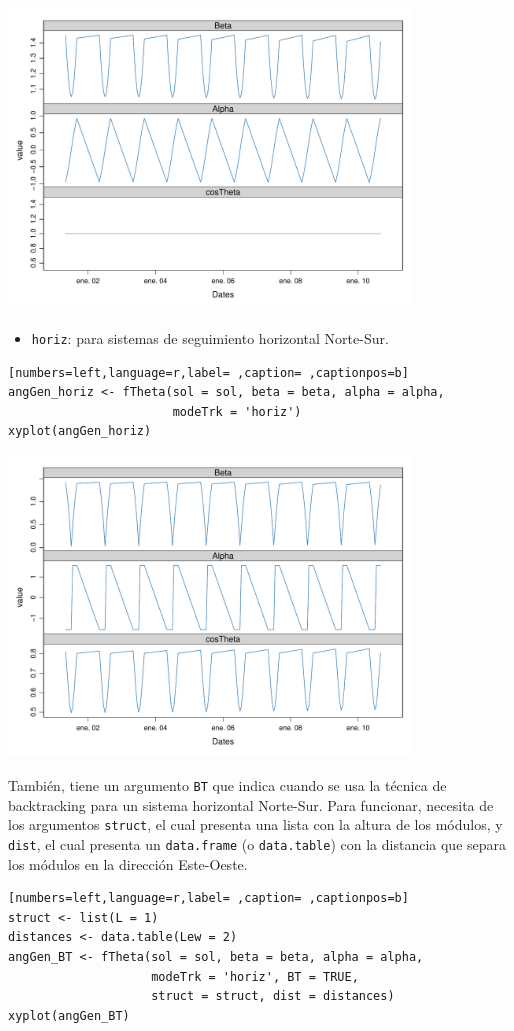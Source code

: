 \begin{itemize}
\begin{center}
\includegraphics[width=0.8\textwidth]{figuras/codigo-fthetatwo.pdf}
\end{center}
\begin{itemize}
\item \texttt{horiz}: para sistemas de seguimiento horizontal Norte-Sur.
\end{itemize}
\begin{lstlisting}[numbers=left,language=r,label= ,caption= ,captionpos=b]
angGen_horiz <- fTheta(sol = sol, beta = beta, alpha = alpha,
                       modeTrk = 'horiz')
xyplot(angGen_horiz)
\end{lstlisting}

\begin{center}
\includegraphics[width=0.8\textwidth]{figuras/codigo-fthetahoriz.pdf}
\end{center}
También, tiene un argumento \texttt{BT} que indica cuando se usa la técnica de backtracking para un sistema horizontal Norte-Sur. Para funcionar, necesita de los argumentos \texttt{struct}, el cual presenta una lista con la altura de los módulos, y \texttt{dist}, el cual presenta un \texttt{data.frame} (o \texttt{data.table}) con la distancia que separa los módulos en la dirección Este-Oeste.
\begin{lstlisting}[numbers=left,language=r,label= ,caption= ,captionpos=b]
struct <- list(L = 1)
distances <- data.table(Lew = 2)
angGen_BT <- fTheta(sol = sol, beta = beta, alpha = alpha,
                    modeTrk = 'horiz', BT = TRUE,
                    struct = struct, dist = distances)
xyplot(angGen_BT)
\end{lstlisting}


\end{itemize}
